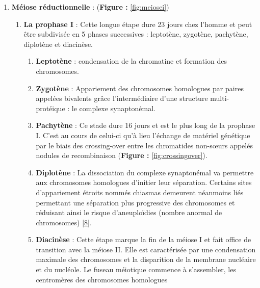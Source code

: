 \documentclass[12pt,twoside]{reedthesis}
\providecommand{\tightlist}{%
  \setlength{\itemsep}{0pt}\setlength{\parskip}{0pt}}
\theoremstyle{definition}
\theoremstyle{definition}
\theoremstyle{remark}
\begin{document}
  \begin{enumerate}
  \def\labelenumi{\arabic{enumi}.}
  \tightlist
  \item
    \textbf{Méiose réductionnelle} : (\textbf{Figure : }\ref{fig:meiosei})
  
    \begin{enumerate}
    \def\labelenumii{\alph{enumii}.}
    \item
      \textbf{La prophase I} : Cette longue étape dure 23 jours chez
      l'homme et peut être subdivisée en 5 phases successives : leptotène,
      zygotène, pachytène, diplotène et diacinèse.
  
      \begin{enumerate}
      \def\labelenumiii{\roman{enumiii}.}
      \tightlist
      \item
        \textbf{Leptotène} : condensation de la chromatine et formation
        des chromosomes.\\
      \item
        \textbf{Zygotène} : Appariement des chromosomes homologues par
        paires appelées bivalents grâce l'intermédiaire d'une structure
        multi-protéique : le complexe synaptonémal.\\
      \item
        \textbf{Pachytène} : Ce stade dure 16 jours et est le plus long de
        la prophase I. C'est au cours de celui-ci qu'à lieu l'échange de
        matériel génétique par le biais des crossing-over entre les
        chromatides non-sœurs appelés nodules de recombinaison
        (\textbf{Figure : }\ref{fig:crossingover}).\\
      \item
        \textbf{Diplotène} : La dissociation du complexe synaptonémal va
        permettre aux chromosomes homologues d'initier leur séparation.
        Certains sites d'appariement étroits nommés chiasmas demeurent
        néanmoins liés permettant une séparation plus progressive des
        chromosomes et réduisant ainsi le risque d'aneuploïdies (nombre
        anormal de chromosomes)
        {[}\protect\hyperlink{ref-Handyside2012}{8}{]}.\\
      \item
        \textbf{Diacinèse} : Cette étape marque la fin de la méiose I et
        fait office de transition avec la méiose II. Elle est caractérisée
        par une condensation maximale des chromosomes et la disparition de
        la membrane nucléaire et du nucléole. Le fuseau méiotique commence
        à s'assembler, les centromères des chromosomes homologues

\end{enumerate}
\end{enumerate}
\end{enumerate}
\end{document}
